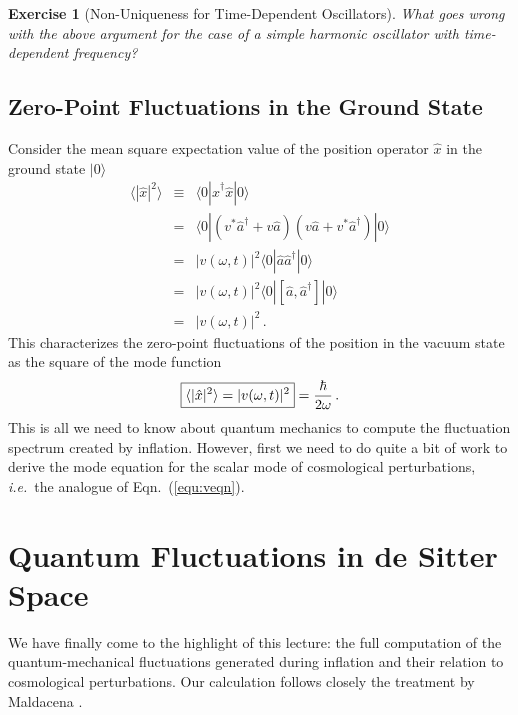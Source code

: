 \documentclass[12pt,letterpaper,rotate]{article}
\newtheorem{thm}{Exercise}
\begin{document}
{\begin{thm}[Non-Uniqueness for  Time-Dependent Oscillators]
What goes wrong with the above argument for the case of a simple harmonic oscillator with time-dependent frequency?
\label{ex:separate}
\end{thm}

\subsection{Zero-Point Fluctuations in the Ground State}

Consider the mean square expectation value of the position operator $\hat{x}$ in the ground state $|0\rangle$
\begin{eqnarray}
\langle |\hat{x}|^2 \rangle &\equiv& \langle 0|\hat{x}^\dagger \hat{x}|0\rangle \nonumber\\
&=& \langle 0|(v^* \hat{a}^\dagger + v \hat{a})(v \hat{a}+v^* \hat{a}^\dagger )|0\rangle \nonumber\\
&=& |v(\omega,t)|^2 \langle 0|\hat{a} \hat{a}^\dagger |0\rangle \nonumber\\
&=& |v(\omega,t)|^2 \langle 0|[\hat{a}, \hat{a}^\dagger] |0\rangle \nonumber\\
&=& |v(\omega,t)|^2\, .
\end{eqnarray}
This characterizes the  zero-point fluctuations of the position in the vacuum state as the square of the mode function
\begin{equation}
\label{equ:fluc}
\fbox{$\displaystyle \langle |\hat{x}|^2 \rangle = |v(\omega,t)|^2$} = \frac{\hbar}{2\omega}\, .
\end{equation}
This is all we need to know about quantum mechanics to compute the fluctuation spectrum created by inflation.
However, first we need to do quite a bit of work to derive the mode equation for the scalar mode of cosmological perturbations, {\it i.e.}~the analogue of Eqn.~(\ref{equ:veqn}).



\section{Quantum Fluctuations in de Sitter Space}
\label{sec:full}

We have finally come to the highlight of this lecture: the full computation of the quantum-mechanical fluctuations generated during inflation and their relation to cosmological perturbations. Our calculation follows closely the treatment by Maldacena \cite{malda}.


}
\end{document}
